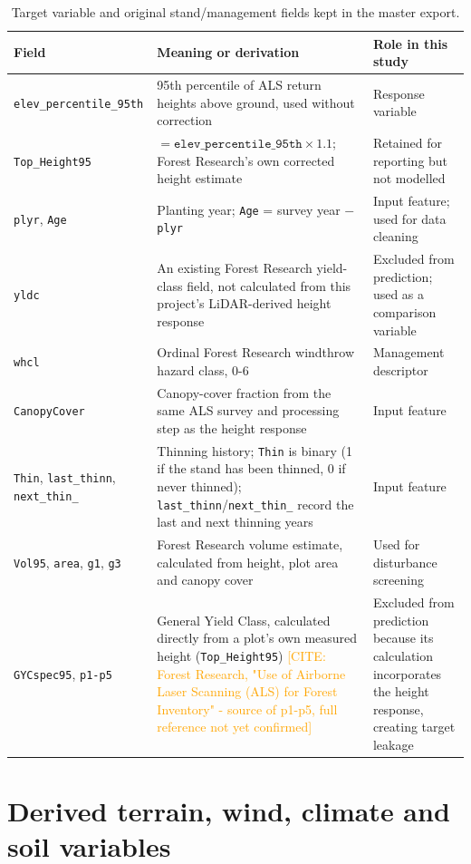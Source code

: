 \documentclass[logo,msc,ai]{infthesis}           %
\newcommand{\ct}[1]{\textcolor{orange}{[CITE: #1]}}
\begin{document}
\begin{table}[!htbp]
\scriptsize
\setlength{\tabcolsep}{3pt}
\renewcommand{\arraystretch}{0.95}
\begin{tabular}{p{2.6cm}p{7.0cm}p{3.2cm}}
\hline
Field & Meaning or derivation & Role in this study \\
\hline
\texttt{elev\_percentile\_95th} & 95th percentile of ALS return heights above ground, used without correction & Response variable \\
\texttt{Top\_Height95} & $=\texttt{elev\_percentile\_95th}\times1.1$; Forest Research's own corrected height estimate & Retained for reporting but not modelled \\
\texttt{plyr}, \texttt{Age} & Planting year; \texttt{Age} = survey year $-$ \texttt{plyr} & Input feature; used for data cleaning \\
\texttt{yldc} & An existing Forest Research yield-class field, not calculated from this project's LiDAR-derived height response & Excluded from prediction; used as a comparison variable \\
\texttt{whcl} & Ordinal Forest Research windthrow hazard class, 0-6 & Management descriptor \\
\texttt{CanopyCover} & Canopy-cover fraction from the same ALS survey and processing step as the height response & Input feature \\
\texttt{Thin}, \texttt{last\_thinn}, \texttt{next\_thin\_} & Thinning history; \texttt{Thin} is binary (1 if the stand has been thinned, 0 if never thinned); \texttt{last\_thinn}/\texttt{next\_thin\_} record the last and next thinning years & Input feature \\
\texttt{Vol95}, \texttt{area}, \texttt{g1}, \texttt{g3} & Forest Research volume estimate, calculated from height, plot area and canopy cover & Used for disturbance screening \\
\texttt{GYCspec95}, \texttt{p1-p5} & General Yield Class, calculated directly from a plot's own measured height (\texttt{Top\_Height95}) \ct{Forest Research, "Use of Airborne Laser Scanning (ALS) for Forest Inventory" - source of p1-p5, full reference not yet confirmed} & Excluded from prediction because its calculation
incorporates the height response, creating target leakage \\
\hline
\end{tabular}
\caption{Target variable and original stand/management fields kept in the master export.}
\label{tab:data-fields}
\end{table}
\section{Derived terrain, wind, climate and soil variables}
\label{sec:data-environmental}
\end{document}
